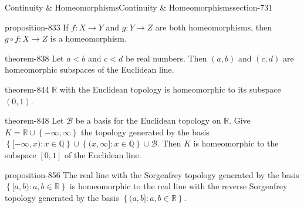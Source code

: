 \documentclass[oneside,10pt,]{article}
\newcommand{\mb}{\mathbb}
\newcommand{\mc}{\mathcal}
\newcommand{\setBuilder}[2]{\left\{#1:#2\right\}}
\newcommand{\setList}[1]{\left\{#1\right\}}
\newcommand{\lt}{<}
\begin{document}
\begin{sectionptx}{Continuity \& Homeomorphisms}{}{Continuity \& Homeomorphisms}{}{}{section-731}
\begin{proposition}{}{}{proposition-833}
\hypertarget{p-834}{}%
If \(f:X\to Y\) and \(g:Y\to Z\) are both homeomorphisms, then \(g\circ f:X\to Z\) is a homeomorphism.%
\end{proposition}
\begin{theorem}{}{}{theorem-838}%
\hypertarget{p-839}{}%
Let \(a\lt b\) and \(c\lt d\) be real numbers. Then \((a,b)\) and \((c,d)\) are homeomorphic subspaces of the Euclidean line.%
\end{theorem}
\begin{theorem}{}{}{theorem-844}%
\hypertarget{p-845}{}%
\(\mb R\) with the Euclidean topology is homeomorphic to its subspace \((0,1)\).%
\end{theorem}
\begin{theorem}{}{}{theorem-848}%
\hypertarget{p-849}{}%
Let \(\mc B\) be a basis for the Euclidean topology on \(\mb R\). Give \(K=\mb R\cup\setList{-\infty,\infty}\) the topology generated by the basis \(\setBuilder{[-\infty,x)}{x\in\mb Q}\cup
\setBuilder{(x,\infty]}{x\in\mb Q}\cup\mc B\). Then \(K\) is homeomorphic to the subspace \([0,1]\) of the Euclidean line.%
\end{theorem}
\begin{proposition}{}{}{proposition-856}%
\hypertarget{p-857}{}%
The real line with the Sorgenfrey topology generated by the basis \(\setBuilder{[a,b)}{a,b\in\mb R}\) is homeomorphic to the real line with the reverse Sorgenfrey topology generated by the basis \(\setBuilder{(a,b]}{a,b\in\mb R}\).%
\end{proposition}
\end{sectionptx}
%
%
\typeout{************************************************}
\typeout{************************************************}
%
\end{document}

